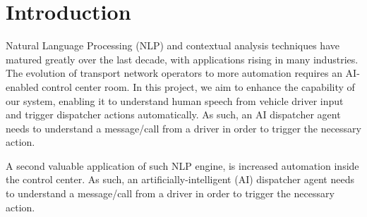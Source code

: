 \chapter{Introduction}
\label{chap:intro}

Natural Language Processing (NLP) and contextual analysis
techniques have matured greatly over the last decade, with
applications rising in many industries. The evolution of transport
network operators to more automation requires an AI-enabled
control center room.
In this project, we aim to enhance the capability of our system,
enabling it to understand human speech from vehicle driver input and
trigger dispatcher actions automatically. As such, an AI dispatcher
agent needs to understand a message/call from a driver in order to
trigger the necessary action.

A second valuable application of such NLP engine, is increased automation inside the control center. As such, an artificially-intelligent (AI) dispatcher agent needs to understand a message/call from a driver in order to trigger the necessary action.


